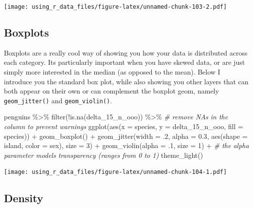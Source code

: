 \documentclass[
]{book}
\newenvironment{Shaded}{\begin{snugshade}}{\end{snugshade}}
\newcommand{\AttributeTok}[1]{\textcolor[rgb]{0.77,0.63,0.00}{#1}}
\newcommand{\CommentTok}[1]{\textcolor[rgb]{0.56,0.35,0.01}{\textit{#1}}}
\newcommand{\DecValTok}[1]{\textcolor[rgb]{0.00,0.00,0.81}{#1}}
\newcommand{\FloatTok}[1]{\textcolor[rgb]{0.00,0.00,0.81}{#1}}
\newcommand{\FunctionTok}[1]{\textcolor[rgb]{0.00,0.00,0.00}{#1}}
\newcommand{\NormalTok}[1]{#1}
\newcommand{\SpecialCharTok}[1]{\textcolor[rgb]{0.00,0.00,0.00}{#1}}
\begin{document}
\texttt{[image: using\_r\_data\_files/figure-latex/unnamed-chunk-103-2.pdf]}

\hypertarget{boxplots}{%
\subsection{Boxplots}\label{boxplots}}

Boxplots are a really cool way of showing you how your data is distributed across each category.
Its particularly important when you have skewed data, or are just simply more interested in the median (as opposed to the mean).
Below I introduce you the standard box plot, while also showing you other layers that can both appear on their own or can complement the boxplot geom, namely \texttt{geom\_jitter()} and \texttt{geom\_violin()}.

\begin{Shaded}
\begin{Highlighting}[]
\NormalTok{penguins }\SpecialCharTok{\%\textgreater{}\%}
  \FunctionTok{filter}\NormalTok{(}\SpecialCharTok{!}\FunctionTok{is.na}\NormalTok{(delta\_15\_n\_ooo)) }\SpecialCharTok{\%\textgreater{}\%}  \CommentTok{\# remove NAs in the column to prevent warnings}
  \FunctionTok{ggplot}\NormalTok{(}\FunctionTok{aes}\NormalTok{(}\AttributeTok{x =}\NormalTok{ species, }\AttributeTok{y =}\NormalTok{ delta\_15\_n\_ooo, }\AttributeTok{fill =}\NormalTok{ species)) }\SpecialCharTok{+} 
  \FunctionTok{geom\_boxplot}\NormalTok{() }\SpecialCharTok{+}
  \FunctionTok{geom\_jitter}\NormalTok{(}\AttributeTok{width =}\NormalTok{ .}\DecValTok{2}\NormalTok{, }\AttributeTok{alpha =} \FloatTok{0.3}\NormalTok{, }\FunctionTok{aes}\NormalTok{(}\AttributeTok{shape =}\NormalTok{ island, }\AttributeTok{color =}\NormalTok{ sex), }\AttributeTok{size =} \DecValTok{3}\NormalTok{) }\SpecialCharTok{+}
  \FunctionTok{geom\_violin}\NormalTok{(}\AttributeTok{alpha =}\NormalTok{ .}\DecValTok{1}\NormalTok{, }\AttributeTok{size =} \DecValTok{1}\NormalTok{) }\SpecialCharTok{+}  \CommentTok{\# the alpha parameter models transparency (ranges from 0 to 1)}
  \FunctionTok{theme\_light}\NormalTok{()}
\end{Highlighting}
\end{Shaded}

\texttt{[image: using\_r\_data\_files/figure-latex/unnamed-chunk-104-1.pdf]}

\hypertarget{density}{%
\subsection{Density}\label{density}}
\end{document}
